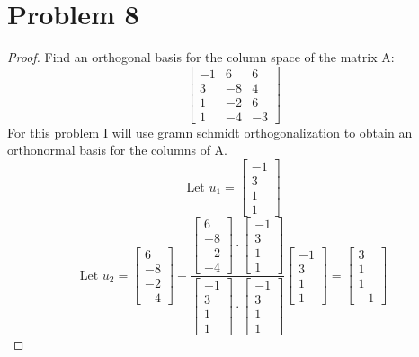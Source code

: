 \documentclass[12pt]{article}
\newcommand{\sect}[1]{\section*{#1}}
\begin{document}
\sect{Problem 8}
\begin{proof}
  Find an orthogonal basis for the column space of the matrix A:
  \[
    \begin{bmatrix}
      -1&6&6\\3&-8&4\\1&-2&6\\1&-4&-3
    \end{bmatrix}
  \]
  For this problem I will use gramn schmidt orthogonalization to obtain an orthonormal basis for the columns of A.
  \[
    \text{Let }u_1=\begin{bmatrix}
      -1\\3\\1\\1
  \end{bmatrix}
  \]
  \[
    \text{Let }u_2=\begin{bmatrix}
      6\\-8\\-2\\-4
  \end{bmatrix}-
  \frac{  \begin{bmatrix}
    6\\-8\\-2\\-4
\end{bmatrix}\cdot \begin{bmatrix}
      -1\\3\\1\\1
  \end{bmatrix}}{\begin{bmatrix}
    -1\\3\\1\\1
\end{bmatrix} \cdot \begin{bmatrix}
    -1\\3\\1\\1
\end{bmatrix}}\begin{bmatrix}
    -1\\3\\1\\1
\end{bmatrix}=\begin{bmatrix}
  3\\1\\1\\-1
\end{bmatrix}
  \]


\end{proof}
\end{document}
